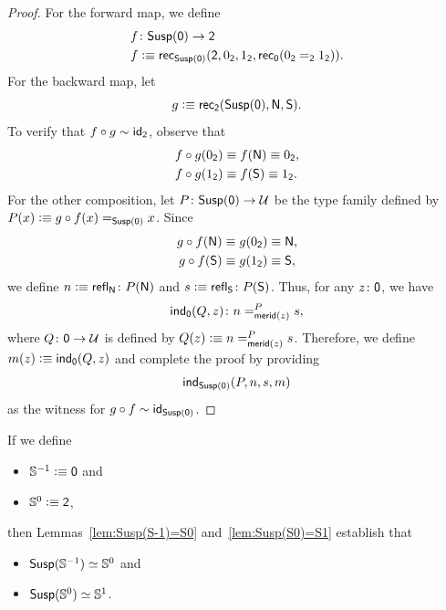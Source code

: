 \begin{proof}
    For the forward map, we define
    \begin{align*}
        f&\colon\fun{Susp}(\fun0)\to\fun2\\
        f&\defeq\fun{rec}_{\fun{Susp}(\fun0)}(
            \fun2,
            0_{\fun2},
            1_{\fun2},
            \fun{rec}_{\fun0}
                (0_{\fun2}\eq{\fun2}1_{\fun2})
        ).
    \end{align*}
    For the backward map, let
    \[
        g\mathrel{\vcentcolon}\equiv\mathsf{rec}_{\mathsf{2}}(
            \mathsf{Susp}(\mathsf{0}),\mathsf{N},\mathsf{S}
        ).
    \]
    To verify that $f\circ g\sim\mathsf{id}_{\mathsf{2}}$, observe that
    \begin{align*}
        f\circ g(0_{\mathsf{2}})&\equiv f(\mathsf{N})\equiv 0_{\mathsf{2}},\\
        f\circ g(1_{\mathsf{2}})&\equiv f(\mathsf{S})\equiv 1_{\mathsf{2}}.
    \end{align*}
    For the other composition, let $P\colon\fun{Susp}(\fun0)\to\univ$ be the type family defined by $P(x)\mathrel{\vcentcolon}\equiv g\circ f(x)\mathrel{=_{\mathsf{Susp}(\mathsf{0})}}x$. Since
    \begin{align*}
        g\circ f(\mathsf{N})&\equiv g(0_{\mathsf{2}})\equiv\mathsf{N},\\
        g\circ f(\mathsf{S})&\equiv g(1_{\mathsf{2}})\equiv\mathsf{S},
    \end{align*}
    we define $n\defeq\fun{refl}_{\fun N}\colon P(\fun N)$ and $s\defeq\fun{refl}_{\fun S}\colon P(\fun S)$. Thus, for any $z\colon\fun0$, we have
    \[
        \fun{ind}_{\fun0}(Q,z)\colon n\eqt{\fun{merid}(z)}Ps,
    \]
    where $Q\colon\fun0\to\univ$ is defined by $Q(z)\mathrel{\vcentcolon}\equiv n=_{\mathsf{merid}(z)}^{P}s$. Therefore, we define $m(z)\mathrel{\vcentcolon}\equiv\mathsf{ind}_{\mathsf{0}}(Q,z)$ and complete the proof by providing
    \[
        \mathsf{ind}_{\mathsf{Susp}(\mathsf{0})}(P,n,s,m)
    \]
    as the witness for $g\circ f\sim\mathsf{id}_{\mathsf{Susp}(\mathsf{0})}$.
\end{proof}

\begin{rem}
    If we define
    \begin{itemize}
        \item $\mathbb S^{-1}\mathrel{\vcentcolon}\equiv\mathsf{0}$ and
        \item $\mathbb S^0\mathrel{\vcentcolon}\equiv\mathsf{2}$,
    \end{itemize}
    then Lemmas~\ref{lem:Susp(S-1)=S0} and~\ref{lem:Susp(S0)=S1} establish that
    \begin{itemize}
        \item $\mathsf{Susp}(\mathbb S^{-1})\simeq\mathbb S^0$ and
        \item $\mathsf{Susp}(\mathbb S^0)\simeq\mathbb S^1$.
    \end{itemize}
\end{rem}


